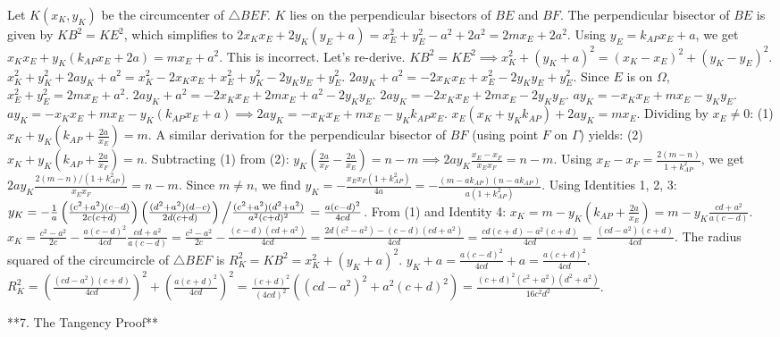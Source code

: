 Let $K(x_K, y_K)$ be the circumcenter of $\triangle BEF$. $K$ lies on the perpendicular bisectors of $BE$ and $BF$.
The perpendicular bisector of $BE$ is given by $KB^2=KE^2$, which simplifies to $2x_Kx_E+2y_K(y_E+a) = x_E^2+y_E^2-a^2+2a^2 = 2mx_E+2a^2$. Using $y_E=k_{AP}x_E+a$, we get $x_Kx_E+y_K(k_{AP}x_E+2a) = mx_E+a^2$. This is incorrect.
Let's re-derive. $KB^2=KE^2 \implies x_K^2+(y_K+a)^2 = (x_K-x_E)^2+(y_K-y_E)^2$.
$x_K^2+y_K^2+2ay_K+a^2 = x_K^2-2x_Kx_E+x_E^2+y_K^2-2y_Ky_E+y_E^2$.
$2ay_K+a^2 = -2x_Kx_E+x_E^2-2y_Ky_E+y_E^2$.
Since $E$ is on $\Omega$, $x_E^2+y_E^2=2mx_E+a^2$.
$2ay_K+a^2 = -2x_Kx_E+2mx_E+a^2-2y_Ky_E$.
$2ay_K = -2x_Kx_E+2mx_E-2y_Ky_E$.
$ay_K = -x_Kx_E+mx_E-y_Ky_E$.
$ay_K = -x_Kx_E+mx_E-y_K(k_{AP}x_E+a) \implies 2ay_K = -x_Kx_E+mx_E-y_Kk_{AP}x_E$.
$x_E(x_K+y_Kk_{AP}) + 2ay_K = mx_E$. Dividing by $x_E \neq 0$:
(1) $x_K + y_K(k_{AP}+\frac{2a}{x_E}) = m$.
A similar derivation for the perpendicular bisector of $BF$ (using point $F$ on $\Gamma$) yields:
(2) $x_K + y_K(k_{AP}+\frac{2a}{x_F}) = n$.
Subtracting (1) from (2): $y_K(\frac{2a}{x_F}-\frac{2a}{x_E}) = n-m \implies 2ay_K\frac{x_E-x_F}{x_Ex_F} = n-m$.
Using $x_E-x_F = \frac{2(m-n)}{1+k_{AP}^2}$, we get $2ay_K \frac{2(m-n)/(1+k_{AP}^2)}{x_Ex_F} = n-m$. Since $m \neq n$, we find $y_K = -\frac{x_Ex_F(1+k_{AP}^2)}{4a} = -\frac{(m-ak_{AP})(n-ak_{AP})}{a(1+k_{AP}^2)}$.
Using Identities 1, 2, 3:
$y_K = -\frac{1}{a} \left(\frac{(c^2+a^2)(c-d)}{2c(c+d)}\right) \left(\frac{(d^2+a^2)(d-c)}{2d(c+d)}\right) \left/ \frac{(c^2+a^2)(d^2+a^2)}{a^2(c+d)^2} \right. = \frac{a(c-d)^2}{4cd}$.
From (1) and Identity 4: $x_K = m - y_K(k_{AP}+\frac{2a}{x_E}) = m - y_K\frac{cd+a^2}{a(c-d)}$.
$x_K = \frac{c^2-a^2}{2c} - \frac{a(c-d)^2}{4cd} \frac{cd+a^2}{a(c-d)} = \frac{c^2-a^2}{2c} - \frac{(c-d)(cd+a^2)}{4cd} = \frac{2d(c^2-a^2) - (c-d)(cd+a^2)}{4cd} = \frac{cd(c+d)-a^2(c+d)}{4cd} = \frac{(cd-a^2)(c+d)}{4cd}$.
The radius squared of the circumcircle of $\triangle BEF$ is $R_K^2 = KB^2 = x_K^2+(y_K+a)^2$.
$y_K+a = \frac{a(c-d)^2}{4cd}+a = \frac{a(c+d)^2}{4cd}$.
$R_K^2 = \left(\frac{(cd-a^2)(c+d)}{4cd}\right)^2 + \left(\frac{a(c+d)^2}{4cd}\right)^2 = \frac{(c+d)^2}{(4cd)^2} \left((cd-a^2)^2 + a^2(c+d)^2\right) = \frac{(c+d)^2(c^2+a^2)(d^2+a^2)}{16c^2d^2}$.

**7. The Tangency Proof**


